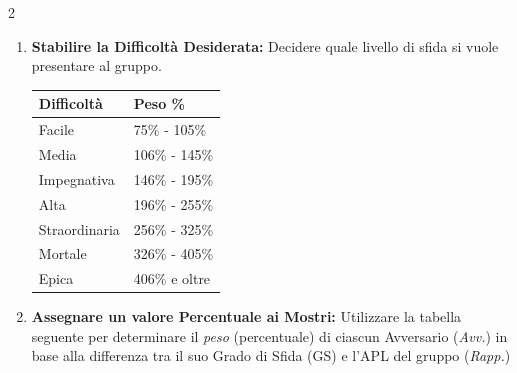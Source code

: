 \begin{multicols}{2}
\begin{enumerate}[leftmargin=*]

\item \textbf{Stabilire la Difficoltà Desiderata:} Decidere quale livello di sfida si vuole presentare al gruppo.


\medskip

\noindent\begin{tabularx}{\linewidth}{lX}
	\toprule
\rowcolor{gray!20}\textbf{Difficoltà} & \textbf{Peso \%}\\
\toprule
	Facile 		& 75\% - 105\%\\
 \rowcolor{gray!20}Media		& 106\% - 145\%\\
	Impegnativa	& 146\% - 195\%\\
 \rowcolor{gray!20}Alta		& 196\% - 255\%\\
Straordinaria	& 256\% - 325\%\\
 \rowcolor{gray!20}Mortale		& 326\% - 405\%\\
	Epica		& 406\% e oltre\\
\end{tabularx}


\item \textbf{Assegnare un valore Percentuale ai Mostri:} Utilizzare la tabella seguente per determinare il \emph{peso} (percentuale) di ciascun Avversario (\emph{Avv.}) in base alla differenza tra il suo Grado di Sfida (GS) e l'APL del gruppo (\emph{Rapp.})

\medskip


\end{enumerate}
\end{multicols}
